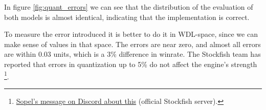 In figure \ref{fig:quant_errors} we can see that the distribution of the evaluation of both models is almost identical, indicating that the implementation is correct.

To measure the error introduced it is better to do it in WDL-space, since we can make sense of values in that space. The errors are near zero, and almost all errors are within 0.03 units, which is a 3\% difference in winrate. The Stockfish team has reported that errors in quantization up to 5\% do not affect the engine's strength \footnote{\href{https://discord.com/channels/435943710472011776/718853716266188890/814260897040039977}{Sopel's message on Discord about this} (official Stockfish server).}.
